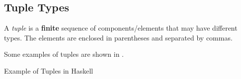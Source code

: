 \subsection{Tuple Types}\label{subsec:Tuple_Types}
\begin{definition}[Tuple]\label{def:Tuple}
  A \emph{tuple} is a \textbf{finite} sequence of components/elements that may have different types.
  The elements are enclosed in parentheses and separated by commas.

  Some examples of tuples are shown in .
\end{definition}

\begin{listing}[h!tbp]
\caption{Example of Tuples in Haskell}
\label{lst:Tuple_Examples}
\end{listing}


